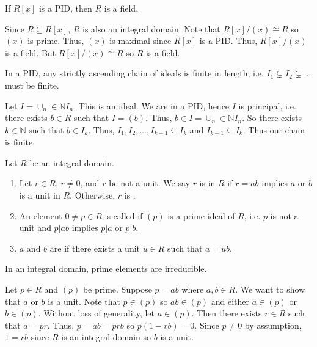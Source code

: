 \documentclass{mathnotes}
\begin{document}
\begin{prop}
  If $R[x]$ is a PID, then $R$ is a field.
\end{prop}

\begin{pf}
  Since $R\subseteq R[x]$, $R$ is also an integral domain. Note that
  $R[x]/(x)\cong R$ so $(x)$ is prime. Thus, $(x)$ is maximal since $R[x]$ is a
  PID. Thus, $R[x]/(x)$ is a field. But $R[x]/(x)\cong R$ so $R$ is a field.
\end{pf}

\begin{thm}
  In a PID, any strictly ascending chain of ideals is finite in length, i.e.
  $I_1\subsetneq I_2\subsetneq\ldots$ must be finite.
\end{thm}

\begin{pf}
  Let $I=\cup_n\in\mathbb{N}I_n$. This is an ideal. We are in a PID, hence $I$
  is principal, i.e. there exists $b\in R$ such that $I=(b)$. Thus, $b\in
  I=\cup_n\in\mathbb{N}I_n$. So there exists $k\in\mathbb{N}$ such that $b\in
  I_k$. Thus, $I_1, I_2,\ldots,I_{k-1}\subseteq I_k$ and $I_{k+1}\subseteq
  I_k$. Thus our chain is finite.
\end{pf}

\begin{defi}
  Let $R$ be an integral domain.
  \begin{enumerate}
    \item Let $r\in R$, $r\ne0$, and $r$ be not a unit. We say $r$ is
       in $R$ if $r=ab$ implies $a$ or $b$ is a unit in
      $R$. Otherwise, $r$ is .
    \item An element $0\ne p\in R$ is called  if $(p)$ is a prime
      ideal of $R$, i.e. $p$ is not a unit and $p\vert ab$ implies $p\vert a$
      or $p\vert b$.
    \item $a$ and $b$ are  if there exists a unit
      $u\in R$ such that $a=ub$.
  \end{enumerate}
\end{defi}

\begin{prop}
  In an integral domain, prime elements are irreducible.
\end{prop}

\begin{pf}
  Let $p\in R$ and $(p)$ be prime. Suppose $p=ab$ where $a,b\in R$. We want to
  show that $a$ or $b$ is a unit. Note that $p\in(p)$ so $ab\in(p)$ and either
  $a\in(p)$ or $b\in(p)$. Without loss of generality, let $a\in(p)$. Then there
  exists $r\in R$ such that $a=pr$. Thus, $p=ab=prb$ so $p(1-rb)=0$. Since
  $p\ne0$ by assumption, $1=rb$ since $R$ is an integral domain so $b$ is a
  unit.
\end{pf}
\end{document}
